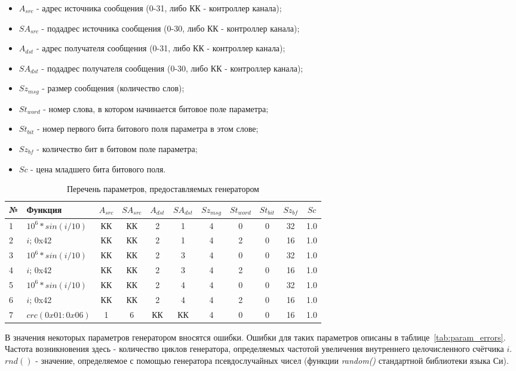 \begin{itemize}
 \item $A_{src}$ - адрес источника сообщения (0-31, либо КК - контроллер 
канала);
 \item $SA_{src}$ - подадрес источника сообщения (0-30, либо КК - контроллер 
канала);
 \item $A_{dst}$ - адрес получателя сообщения (0-31, либо КК - контроллер 
канала);
 \item $SA_{dst}$ - подадрес получателя сообщения (0-30, либо КК - контроллер 
канала);
 \item $Sz_{msg}$ - размер сообщения (количество слов);
 \item $St_{word}$ - номер слова, в котором начинается битовое поле параметра;
 \item $St_{bit}$ - номер первого бита битового поля параметра в этом слове;
 \item $Sz_{bf}$ - количество бит в битовом поле параметра;
 \item $Sc$ - цена младшего бита битового поля.
\end{itemize}

\begin{table}[H]
\centering
\begin{tabular}{|l|l|*{9}{c|}}
\hline
 № & Функция & $A_{src}$ & $SA_{src}$ & $A_{dst}$ & $SA_{dst}$ & $Sz_{msg}$ & 
$St_{word}$ & $St_{bit}$ & $Sz_{bf}$ & $Sc$ \\
\hline
1 & $10^6 * sin(i / 10)$ & КК & КК & 2 & 1 & 4 & 0 & 0 & 32 & 1.0 \\
2 & $i$; 0x42 & КК & КК & 2 & 1 & 4 & 2 & 0 & 16 & 1.0 \\
3 & $10^6 * sin(i / 10)$ & КК & КК & 2 & 3 & 4 & 0 & 0 & 32 & 1.0 \\
4 & $i$; 0x42 & КК & КК & 2 & 3 & 4 & 2 & 0 & 16 & 1.0 \\
5 & $10^6 * sin(i / 10)$ & КК & КК & 2 & 4 & 4 & 0 & 0 & 32 & 1.0 \\
6 & $i$; 0x42 & КК & КК & 2 & 4 & 4 & 2 & 0 & 16 & 1.0 \\
7 & $crc(0x01:0x06)$ & 1 & 6 & КК & КК & 4 & 0 & 0 & 16 & 1.0 \\
\hline 
\end{tabular}
\caption{Перечень параметров, предоставляемых генератором}
\label{tab:params}
\end{table}

В значения некоторых параметров генератором вносятся ошибки. Ошибки 
для таких параметров описаны в таблице~\ref{tab:param_errors}. Частота 
возникновения здесь - количество циклов генератора, определяемых частотой 
увеличения внутреннего целочисленного счётчика $i$. $rnd()$ - значение, 
определяемое с помощью генератора псевдослучайных чисел (функции 
\textit{random()} стандартной библиотеки языка Си).

